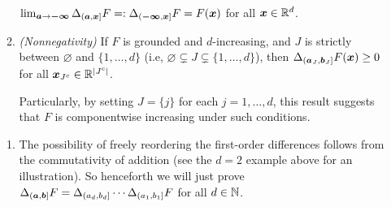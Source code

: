 \begin{enumerate}
\begin{enumerate}
\(\lim_{\bm{a}\to\bm{-\infty}}\Delta_{(\bm{a},\bm{x}]}F=:\Delta_{(\bm{-\infty},\bm{x}]}F=F(\bm{x})\)
for all \(\bm{x}\in\mathbb{R}^d\).
\item\label{it:f-vol-nonneg} \emph{(Nonnegativity)} If \(F\) is grounded and \(d\)-increasing, and
\(J\) is strictly between \(\varnothing\) and \(\{1,\dotsc,d\}\) (i.e,
\(\varnothing\subsetneq J\subsetneq \{1,\dotsc,d\}\)), then
\(\Delta_{(\bm{a}_{J},\bm{b}_{J}]}F(\bm{x})\ge 0\) for all
\(\bm{x}_{J^c}\in\mathbb{R}^{|J^c|}\).
\begin{note}
Particularly, by setting \(J=\{j\}\) for each \(j=1,\dotsc,d\), this result
suggests that \(F\) is componentwise increasing under such conditions.
\end{note}
\end{enumerate}
\begin{pf}
\begin{enumerate}
\item The possibility of freely reordering the first-order differences follows
from the commutativity of addition (see the \(d=2\) example above for an
illustration). So henceforth we will just prove \(\Delta_{(\bm{a},\bm{b}]}F
=\Delta_{(a_d,b_d]}\dotsb\Delta_{(a_1,b_1]}F\) for all \(d\in\mathbb{N}\).


\end{enumerate}
\end{pf}
\end{enumerate}
